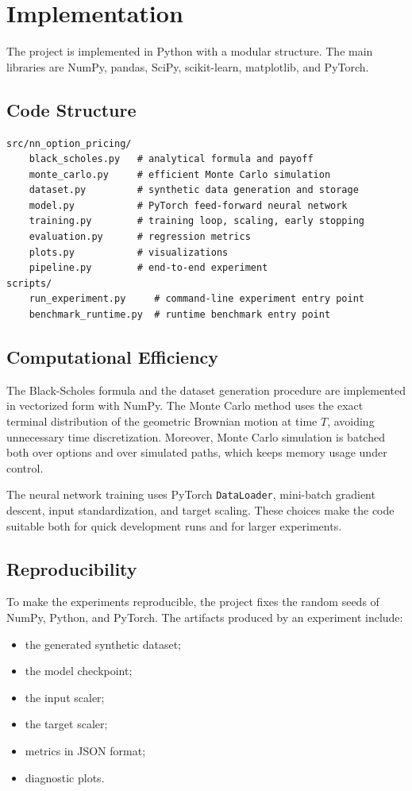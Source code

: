 \chapter{Implementation}

The project is implemented in Python with a modular structure.
The main libraries are NumPy, pandas, SciPy, scikit-learn, matplotlib, and PyTorch.

\section{Code Structure}

\begin{lstlisting}[style=pythonstyle, caption={Main project structure.}]
src/nn_option_pricing/
    black_scholes.py   # analytical formula and payoff
    monte_carlo.py     # efficient Monte Carlo simulation
    dataset.py         # synthetic data generation and storage
    model.py           # PyTorch feed-forward neural network
    training.py        # training loop, scaling, early stopping
    evaluation.py      # regression metrics
    plots.py           # visualizations
    pipeline.py        # end-to-end experiment
scripts/
    run_experiment.py     # command-line experiment entry point
    benchmark_runtime.py  # runtime benchmark entry point
\end{lstlisting}

\section{Computational Efficiency}

The Black-Scholes formula and the dataset generation procedure are implemented in vectorized form with NumPy.
The Monte Carlo method uses the exact terminal distribution of the geometric Brownian motion at time $T$, avoiding unnecessary time discretization.
Moreover, Monte Carlo simulation is batched both over options and over simulated paths, which keeps memory usage under control.

The neural network training uses PyTorch \texttt{DataLoader}, mini-batch gradient descent, input standardization, and target scaling.
These choices make the code suitable both for quick development runs and for larger experiments.

\section{Reproducibility}

To make the experiments reproducible, the project fixes the random seeds of NumPy, Python, and PyTorch.
The artifacts produced by an experiment include:

\begin{itemize}
    \item the generated synthetic dataset;
    \item the model checkpoint;
    \item the input scaler;
    \item the target scaler;
    \item metrics in JSON format;
    \item diagnostic plots.
\end{itemize}
